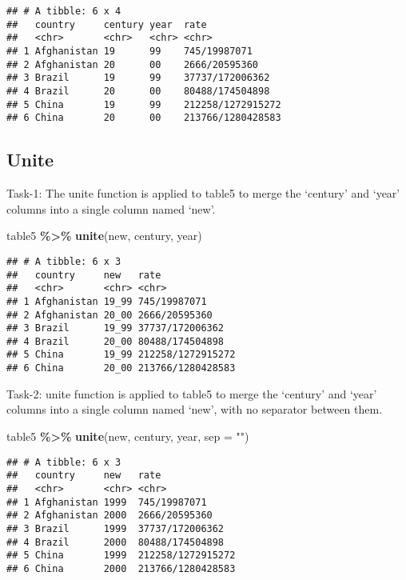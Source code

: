 \documentclass[
]{article}
\newenvironment{Shaded}{\begin{snugshade}}{\end{snugshade}}
\newcommand{\AttributeTok}[1]{\textcolor[rgb]{0.13,0.29,0.53}{#1}}
\newcommand{\FunctionTok}[1]{\textcolor[rgb]{0.13,0.29,0.53}{\textbf{#1}}}
\newcommand{\NormalTok}[1]{#1}
\newcommand{\SpecialCharTok}[1]{\textcolor[rgb]{0.81,0.36,0.00}{\textbf{#1}}}
\newcommand{\StringTok}[1]{\textcolor[rgb]{0.31,0.60,0.02}{#1}}
\begin{document}
\begin{verbatim}
## # A tibble: 6 x 4
##   country     century year  rate             
##   <chr>       <chr>   <chr> <chr>            
## 1 Afghanistan 19      99    745/19987071     
## 2 Afghanistan 20      00    2666/20595360    
## 3 Brazil      19      99    37737/172006362  
## 4 Brazil      20      00    80488/174504898  
## 5 China       19      99    212258/1272915272
## 6 China       20      00    213766/1280428583
\end{verbatim}

\hypertarget{unite}{%
\subsection{Unite}\label{unite}}

Task-1: The unite function is applied to table5 to merge the `century'
and `year' columns into a single column named `new'.

\begin{Shaded}
\begin{Highlighting}[]
\NormalTok{table5 }\SpecialCharTok{\%\textgreater{}\%} 
  \FunctionTok{unite}\NormalTok{(new, century, year)}
\end{Highlighting}
\end{Shaded}

\begin{verbatim}
## # A tibble: 6 x 3
##   country     new   rate             
##   <chr>       <chr> <chr>            
## 1 Afghanistan 19_99 745/19987071     
## 2 Afghanistan 20_00 2666/20595360    
## 3 Brazil      19_99 37737/172006362  
## 4 Brazil      20_00 80488/174504898  
## 5 China       19_99 212258/1272915272
## 6 China       20_00 213766/1280428583
\end{verbatim}

Task-2: unite function is applied to table5 to merge the `century' and
`year' columns into a single column named `new', with no separator
between them.

\begin{Shaded}
\begin{Highlighting}[]
\NormalTok{table5 }\SpecialCharTok{\%\textgreater{}\%} 
  \FunctionTok{unite}\NormalTok{(new, century, year, }\AttributeTok{sep =} \StringTok{""}\NormalTok{)}
\end{Highlighting}
\end{Shaded}

\begin{verbatim}
## # A tibble: 6 x 3
##   country     new   rate             
##   <chr>       <chr> <chr>            
## 1 Afghanistan 1999  745/19987071     
## 2 Afghanistan 2000  2666/20595360    
## 3 Brazil      1999  37737/172006362  
## 4 Brazil      2000  80488/174504898  
## 5 China       1999  212258/1272915272
## 6 China       2000  213766/1280428583
\end{verbatim}
\end{document}
